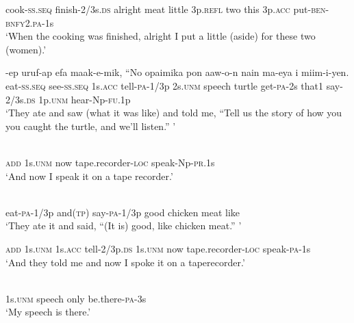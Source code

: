 {\ea\label{ex:a:x4}
cook-\textsc{ss.seq}  finish-2/3s.\textsc{ds}  alright  meat  little  3p.\textsc{refl}  two  this  3p.\textsc{acc}  put-\textsc{ben}-\textsc{bnfy}2.\textsc{pa}-1s \\


\glt ‘When the cooking was finished, alright I put a little (aside) for these two (women).’ \\
\z


\ea\label{ex:a:x5}
-ep  uruf-ap  efa  maak-e-mik,  “No  opaimika     pon{  aaw-o-n  nain  ma-eya  i  miim-i-yen.} \\
eat-\textsc{ss.seq}  see-\textsc{ss.seq}  1s.\textsc{acc}  tell-\textsc{pa}-1/3p  2s.\textsc{unm}  speech  turtle  get-\textsc{pa}-2s  that1  say-2/3s.\textsc{ds}  1p.\textsc{unm}  hear-Np-\textsc{fu}.1p \\


\glt ‘They ate and saw (what it was like) and told me, “Tell us the story of how you you caught the turtle, and we’ll listen.” ’ \\
\z


\ea\label{ex:a:x6}
 \\
\textsc{add}  1s.\textsc{unm}  now  tape.recorder-\textsc{loc}  speak-Np-\textsc{pr}.1s \\
\glt ‘And now I speak it on a tape recorder.’ \\
\z


\ea\label{ex:a:x7}
 \\
eat-\textsc{pa}-1/3p  and(\textsc{tp})  say-\textsc{pa}-1/3p  good  chicken  meat  like \\
\glt ‘They ate it and said, “(It is) good, like chicken meat.” ’ \\
\z


\ea\label{ex:a:x8}
\textsc{add}  1s.\textsc{unm}  1s.\textsc{acc}  tell-2/3p.\textsc{ds}  1s.\textsc{unm}  now  tape.recorder-\textsc{loc}  speak-\textsc{pa}-1s \\


\glt ‘And they told me and now I spoke it on a taperecorder.’ \\
\z


\ea\label{ex:a:x9}
 \\
1s.\textsc{unm}  speech  only  be.there-\textsc{pa}-3s \\
\glt ‘My speech is there.’ \\
\z


}
